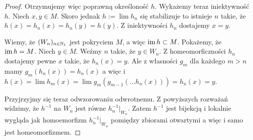 \begin{thm}
\begin{proof}
    
    Otrzymujemy więc poprawną określoność $h$. Wykażemy teraz iniektywność $h$. Niech $x, y \in M$. Skoro jednak $h := \lim h_n$ się stabilizuje to istnieje $n$ takie, że $h(x) = h_n(x) = h_n(y) = h(y)$. Z iniektywności $h_n$ dostajemy $x = y$.
    
    Wiemy, że $(W_n)_{n\in{\mathbb{N}_1}}$ jest pokryciem $M$, a więc $\operatorname{im} h \subset M$. Pokażemy, że $\operatorname{im} h = M$. Niech $y\in M$. Weźmy $n$ takie, że $y\in W_n$. Z homeomorficzności $h_n$ dostajemy pewne $x$ takie, że $h_n(x) = y$. Ale z własności $g_m$ dla każdego $m > n$ mamy $g_m(h_n(x)) = h_n(x)$ a więc i $h(x) = \lim h_m(x) = \lim g_m(g_{m-1}(\dots h_n(x))) = h_n(x) = y$.
    
    Przyjrzyjmy się teraz odwzorowaniu odwrotnemu. Z powyższych rozważań widzimy, że $h^{-1}$ na $W_n$ jest równe $h_n^{-1}|_{W_n}$. Zatem $h^{-1}$ jest bijekcją i lokalnie wygląda jak homoemorfizm $h_n^{-1}|_{W_n}$ pomiędzy zbiorami otwartymi a więc i samo jest homeomorfizmem.
  \end{proof}
\end{thm} 